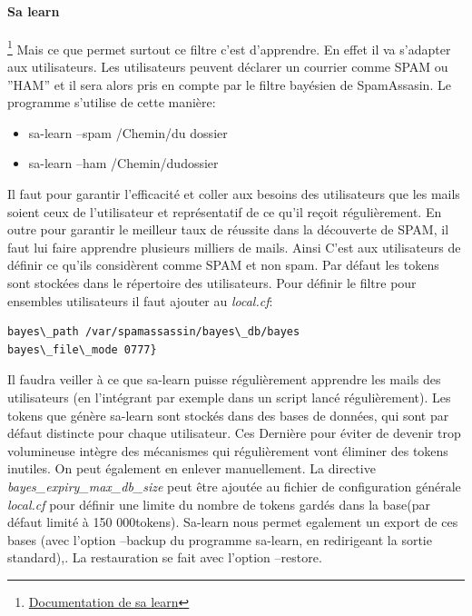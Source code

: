 \documentclass[a4paper,11pt]{article}
\begin{document}
\paragraph{Sa learn}\footnote{\href{https://spamassassin.apache.org/full/3.1.x/doc/sa-learn.html}{Documentation de sa learn}}
Mais ce que permet surtout ce filtre c'est d'apprendre. En effet il va s'adapter aux utilisateurs. Les utilisateurs
peuvent déclarer un courrier comme SPAM ou ''HAM'' et il sera alors pris en compte par le filtre bayésien de SpamAssasin.
Le programme s'utilise de cette manière:
\begin{itemize}
 \item sa-learn --spam /Chemin/du dossier
 \item sa-learn --ham /Chemin/dudossier
\end{itemize}
Il faut pour garantir l'efficacité et coller aux besoins des utilisateurs que les mails soient ceux de l’utilisateur 
et représentatif de ce qu'il reçoit régulièrement. En outre pour garantir le meilleur taux de réussite
dans la découverte de SPAM, il faut lui faire apprendre plusieurs milliers de mails. Ainsi C'est aux utilisateurs de définir 
ce qu'ils considèrent comme SPAM et non spam. 
\linebreak
Par défaut les tokens sont stockées dans le répertoire des utilisateurs. Pour définir le filtre pour ensembles utilisateurs il faut ajouter 
au \emph{local.cf}:
\begin{lstlisting}[frame=single]
bayes\_path /var/spamassassin/bayes\_db/bayes
bayes\_file\_mode 0777}
\end{lstlisting}
Il faudra veiller à ce que sa-learn puisse régulièrement apprendre les mails des utilisateurs (en l'intégrant par exemple dans un script lancé régulièrement).
\linebreak
Les tokens que génère sa-learn sont stockés dans des bases de données, qui sont par défaut distincte pour chaque utilisateur. Ces Dernière pour éviter de devenir 
trop volumineuse intègre des mécanismes qui régulièrement vont éliminer des tokens inutiles. On peut également en enlever manuellement.
La directive \emph{bayes\_expiry\_max\_db\_size} peut être ajoutée au fichier de configuration générale 
\emph{local.cf} pour définir une limite du nombre de tokens gardés dans la base(par défaut limité à 150 000tokens).
\linebreak
Sa-learn nous permet egalement un export de ces bases (avec l'option --backup du programme sa-learn, en redirigeant la sortie standard),. La restauration se fait 
avec l'option --restore. 
\end{document}
